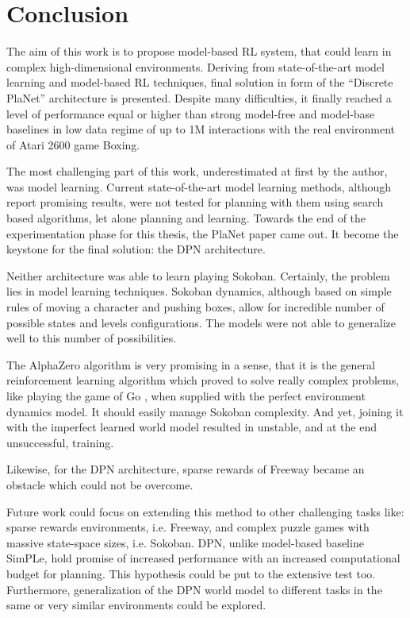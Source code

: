 \section{Conclusion}

The aim of this work is to propose model-based RL system, that could learn in complex high-dimensional environments. Deriving from state-of-the-art model learning \cite{Algo.RecurrentEnvSim}\cite{Algo.JointFrameRewardPrediction}\cite{Algo.FastGenerativeModels} and model-based RL \cite{Algo.SimPLe}\cite{Algo.VPN}\cite{Algo.WorldModels}\cite{Algo.PlaNet} techniques, final solution in form of the ``Discrete PlaNet'' architecture is presented. Despite many difficulties, it finally reached a level of performance equal or higher than strong model-free and model-base baselines in low data regime of up to 1M interactions with the real environment of Atari 2600 game Boxing.

The most challenging part of this work, underestimated at first by the author, was model learning. Current state-of-the-art model learning methods, although report promising results, were not tested for planning with them using search based algorithms, let alone planning and learning. Towards the end of the experimentation phase for this thesis, the PlaNet paper came out. It become the keystone for the final solution: the DPN architecture.

Neither architecture was able to learn playing Sokoban. Certainly, the problem lies in model learning techniques. Sokoban dynamics, although based on simple rules of moving a character and pushing boxes, allow for incredible number of possible states and levels configurations. The models were not able to generalize well to this number of possibilities.

The AlphaZero algorithm is very promising in a sense, that it is the general reinforcement learning algorithm which proved to solve really complex problems, like playing the game of Go \cite{Algo.AlphaGoZero}, when supplied with the perfect environment dynamics model. It should easily manage Sokoban complexity. And yet, joining it with the imperfect learned world model resulted in unstable, and at the end unsuccessful, training. 

Likewise, for the DPN architecture, sparse rewards of Freeway became an obstacle which could not be overcome.

Future work could focus on extending this method to other challenging tasks like: sparse rewards environments, i.e. Freeway, and complex puzzle games with massive state-space sizes, i.e. Sokoban.
DPN, unlike model-based baseline SimPLe, hold promise of increased performance with an increased computational budget for planning. This hypothesis could be put to the extensive test too.
Furthermore, generalization of the DPN world model to different tasks in the same or very similar environments could be explored.
